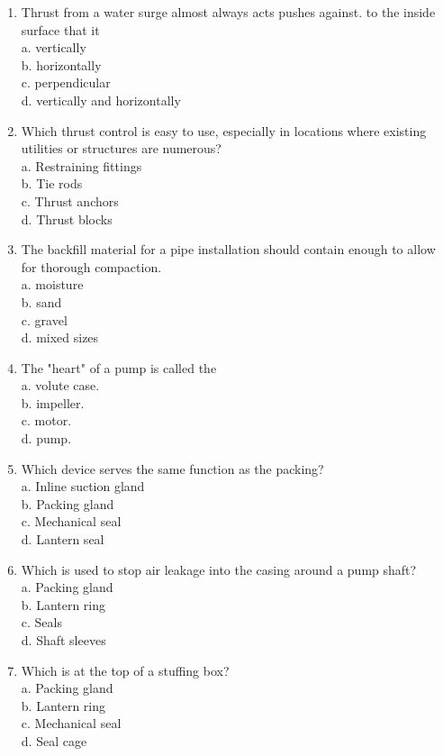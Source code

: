 \documentclass[10pt]{article}
\begin{document}
\begin{enumerate}
  \item Thrust from a water surge almost always acts pushes against. to the inside surface that it\\
a. vertically\\
b. horizontally\\
c. perpendicular\\
d. vertically and horizontally

  \item Which thrust control is easy to use, especially in locations where existing utilities or structures are numerous?\\
a. Restraining fittings\\
b. Tie rods\\
c. Thrust anchors\\
d. Thrust blocks

  \item The backfill material for a pipe installation should contain enough to allow for thorough compaction.\\
a. moisture\\
b. sand\\
c. gravel\\
d. mixed sizes

  \item The "heart" of a pump is called the\\
a. volute case.\\
b. impeller.\\
c. motor.\\
d. pump.

  \item Which device serves the same function as the packing?\\
a. Inline suction gland\\
b. Packing gland\\
c. Mechanical seal\\
d. Lantern seal

  \item Which is used to stop air leakage into the casing around a pump shaft?\\
a. Packing gland\\
b. Lantern ring\\
c. Seals\\
d. Shaft sleeves

  \item Which is at the top of a stuffing box?\\
a. Packing gland\\
b. Lantern ring\\
c. Mechanical seal\\
d. Seal cage 


\end{enumerate}
\end{document}
